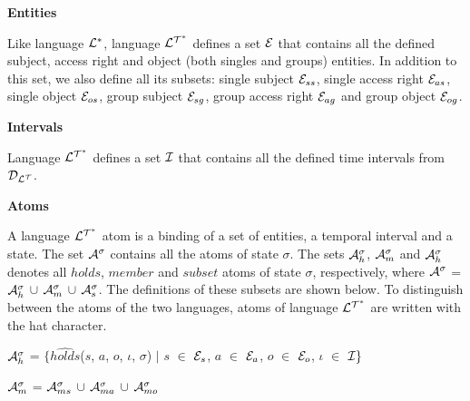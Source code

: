 \documentclass[11pt]{report}
\newenvironment{vquote}
{
  \begin{list}{}{\leftmargin 1em}\item[]
}
{
  \end{list}
}
\begin{document}
          \begin{itemize}
            \item
              {\bf Entities}

              Like language ${\cal L^*}$, language ${\cal L^{T^*}}$ defines
              a set ${\cal E}$ that contains all the defined subject, access
              right and object (both singles and groups) entities. In addition
              to this set, we also define all its subsets: single subject
              ${\cal E}_{ss}$, single access right ${\cal E}_{as}$, single
              object ${\cal E}_{os}$, group subject ${\cal E}_{sg}$, group
              access right ${\cal E}_{ag}$ and group object ${\cal E}_{og}$.

            \item
              {\bf Intervals}

              Language ${\cal L^{T^*}}$ defines a set ${\cal I}$ that contains
              all the defined time intervals from ${\cal D_{L^T}}$.

            \item
              {\bf Atoms}

              A language ${\cal L^{T^*}}$ atom is a binding of a set of
              entities, a temporal interval and a state. The set
              ${\cal A}^\sigma$ contains all the atoms of state $\sigma$.
              The sets ${\cal A}^{\sigma}_{h}$, ${\cal A}^{\sigma}_{m}$ and
              ${\cal A}^{\sigma}_{h}$ denotes all $holds$, $member$ and
              $subset$ atoms of state $\sigma$, respectively, where
              ${\cal A}^\sigma$ = ${\cal A}^{\sigma}_{h}$ $\cup$
              ${\cal A}^{\sigma}_{m}$ $\cup$ ${\cal A}^{\sigma}_{s}$. The
              definitions of these subsets are shown below. To distinguish
              between the atoms of the two languages, atoms of language
              ${\cal L^{T^*}}$ are written with the hat character.

              \begin{vquote}
                ${\cal A}^{\sigma}_{h}$ =
                  $\{\hat{holds}$($s$, $a$, $o$, $\iota$, $\sigma$) $\mid$
                  $s$ $\in$ ${\cal E}_{s}$,
                  $a$ $\in$ ${\cal E}_{a}$,
                  $o$ $\in$ ${\cal E}_{o}$, 
                  $\iota$ $\in$ ${\cal I}\}$ 
    
                ${\cal A}^{\sigma}_{m}$ =
                  ${\cal A}^{\sigma}_{ms}$ $\cup$
                  ${\cal A}^{\sigma}_{ma}$ $\cup$
                  ${\cal A}^{\sigma}_{mo}$
    

\end{vquote}
\end{itemize}
\end{document}
